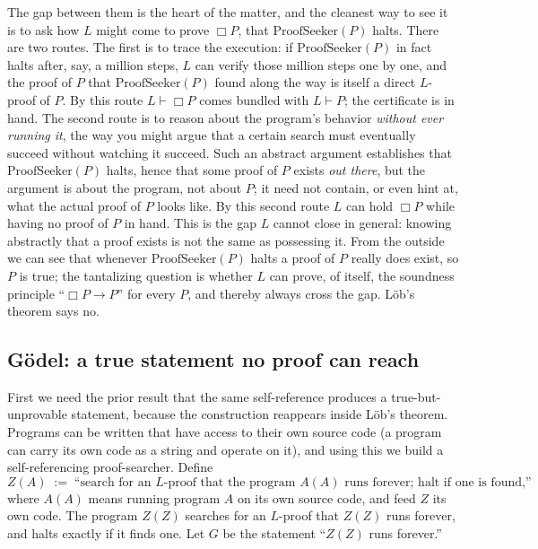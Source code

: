 \documentclass[10pt]{article}
\theoremstyle{definition}
\theoremstyle{remark}
\newcommand{\prov}{\vdash}            %
\newcommand{\Prov}{\Box}              %
\newcommand{\PS}{\mathrm{ProofSeeker}}
\begin{document}
The gap between them is the heart of the matter, and the cleanest way to see it is to ask how $L$ might come to prove $\Prov P$, that $\PS(P)$ halts. There are two routes. The first is to trace the execution: if $\PS(P)$ in fact halts after, say, a million steps, $L$ can verify those million steps one by one, and the proof of $P$ that $\PS(P)$ found along the way is itself a direct $L$-proof of $P$. By this route $L \prov \Prov P$ comes bundled with $L \prov P$; the certificate is in hand. The second route is to reason about the program's behavior \emph{without ever running it}, the way you might argue that a certain search must eventually succeed without watching it succeed. Such an abstract argument establishes that $\PS(P)$ halts, hence that some proof of $P$ exists \emph{out there}, but the argument is about the program, not about $P$; it need not contain, or even hint at, what the actual proof of $P$ looks like. By this second route $L$ can hold $\Prov P$ while having no proof of $P$ in hand. This is the gap $L$ cannot close in general: knowing abstractly that a proof exists is not the same as possessing it. From the outside we can see that whenever $\PS(P)$ halts a proof of $P$ really does exist, so $P$ is true; the tantalizing question is whether $L$ can prove, of itself, the soundness principle ``$\Prov P \to P$'' for every $P$, and thereby always cross the gap. L\"ob's theorem says no.

\subsection{G\"odel: a true statement no proof can reach}
\label{sec:godel}

First we need the prior result that the same self-reference produces a true-but-unprovable statement, because the construction reappears inside L\"ob's theorem. Programs can be written that have access to their own source code (a program can carry its own code as a string and operate on it), and using this we build a self-referencing proof-searcher. Define
\[
Z(A) \;:=\; \text{``search for an $L$-proof that the program $A(A)$ runs forever; halt if one is found,''}
\]
where $A(A)$ means running program $A$ on its own source code, and feed $Z$ its own code. The program $Z(Z)$ searches for an $L$-proof that $Z(Z)$ runs forever, and halts exactly if it finds one. Let $G$ be the statement ``$Z(Z)$ runs forever.''
\end{document}
